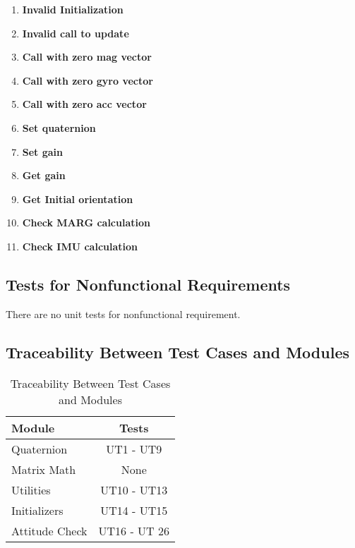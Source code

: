 \documentclass[12pt, titlepage]{article}
\newcommand{\UTthetestnum}{UT\theutestnum}
\begin{document}
\begin{enumerate}
  \item[\refstepcounter{utestnum} \UTthetestnum:] \textbf{Invalid Initialization}
  \item[\refstepcounter{utestnum} \UTthetestnum:] \textbf{Invalid call to update}
  \item[\refstepcounter{utestnum} \UTthetestnum:] \textbf{Call with zero mag vector}
  \item[\refstepcounter{utestnum} \UTthetestnum:] \textbf{Call with zero gyro vector}
  \item[\refstepcounter{utestnum} \UTthetestnum:] \textbf{Call with zero acc vector}
  \item[\refstepcounter{utestnum} \UTthetestnum:] \textbf{Set quaternion}
  \item[\refstepcounter{utestnum} \UTthetestnum:] \textbf{Set gain}
  \item[\refstepcounter{utestnum} \UTthetestnum:] \textbf{Get gain}
  \item[\refstepcounter{utestnum} \UTthetestnum:] \textbf{Get Initial orientation}
  \item[\refstepcounter{utestnum} \UTthetestnum:] \textbf{Check MARG calculation}
  \item[\refstepcounter{utestnum} \UTthetestnum:] \textbf{Check IMU calculation}
\end{enumerate}

\subsection{Tests for Nonfunctional Requirements}

There are no unit tests for nonfunctional requirement.

\subsection{Traceability Between Test Cases and Modules}

\begin{table}[h]
  \centering
  \caption{Traceability Between Test Cases and Modules}
  \vspace{3mm}
  \label{tab:my-table}
  \begin{tabular}{l|c}
  Module         & Tests \\ \hline
  Quaternion     & UT1 - UT9      \\
  Matrix Math    &  None     \\
  Utilities      &   UT10 - UT13    \\
  Initializers   &  UT14 - UT15     \\
  Attitude Check &    UT16 - UT 26
  \end{tabular}
  \end{table}
\end{document}
